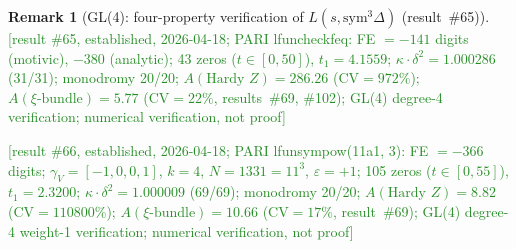 \documentclass[11pt, a4paper]{article}
\theoremstyle{definition}
\newtheorem{remark}{Remark}[section]
\theoremstyle{plain}
\begin{document}
\begin{remark}[GL(4): four-property verification of $L(s, \mathrm{sym}^3\Delta)$ (result~\#65)]
\textcolor{ForestGreen}{[result \#65, established, 2026-04-18;
PARI lfuncheckfeq: FE ${=}-141$ digits (motivic), $-380$ (analytic);
43 zeros ($t{\in}[0,50]$), $t_1{=}4.1559$;
$\kappa{\cdot}\delta^2{=}1.000286$ (31/31); monodromy 20/20;
$A(\text{Hardy }Z){=}286.26$ (CV${=}972\%$); $A(\xi\text{-bundle}){=}5.77$ (CV${=}22\%$, results~\#69, \#102);
GL(4) degree-4 verification; numerical verification, not proof]}

\textcolor{ForestGreen}{[result \#66, established, 2026-04-18;
PARI lfunsympow(11a1, 3): FE ${=}-366$ digits;
$\gamma_V{=}[-1,0,0,1]$, $k{=}4$, $N{=}1331{=}11^3$, $\varepsilon{=}+1$;
105 zeros ($t{\in}[0,55]$), $t_1{=}2.3200$;
$\kappa{\cdot}\delta^2{=}1.000009$ (69/69); monodromy 20/20;
$A(\text{Hardy }Z){=}8.82$ (CV${=}110800\%$); $A(\xi\text{-bundle}){=}10.66$ (CV${=}17\%$, result~\#69);
GL(4) degree-4 weight-1 verification; numerical verification, not proof]}
\end{remark}
\end{document}

